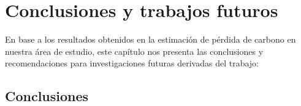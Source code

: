\newpage{\ } 
\thispagestyle{empty} 

\chapter{Conclusiones y trabajos futuros}
En base a los resultados obtenidos en la estimaci\'on de p\'erdida de carbono en nuestra \'area de estudio, este cap\'itulo nos presenta las conclusiones y recomendaciones para investigaciones futuras derivadas del trabajo:
\section{Conclusiones}

